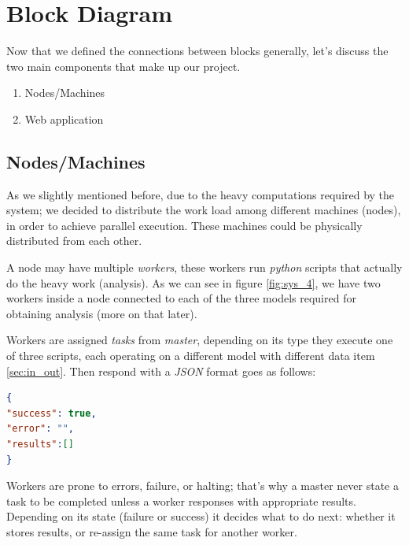 \newpage
\section{Block Diagram}
Now that we defined the connections between blocks generally, let's discuss the two main components that make up our project.
\begin{enumerate}
    \item Nodes/Machines
    \item Web application
\end{enumerate}


\subsection{Nodes/Machines}
As we slightly mentioned before, due to the heavy computations required by the system; we decided to distribute the work load among different machines (nodes), in order to achieve parallel execution. These machines could be physically distributed from each other. 

A node may have multiple \textit{workers}, these workers run \textit{python} scripts that actually do the heavy work (analysis). As we can see in figure \ref{fig:sys_4}, we have two workers inside a node connected to each of the three models required for obtaining analysis (more on that later).

Workers are assigned \textit{tasks} from \textit{master}, depending on its type they execute one of three scripts, each operating on a different model with different data item \ref{sec:in_out}. Then respond with a \textit{JSON} format goes as follows:

\begin{lstlisting}[language=json,firstnumber=1]
{
"success": true,
"error": "",
"results":[]
}
\end{lstlisting}


Workers are prone to errors, failure, or halting; that's why a master never state a task to be completed unless a worker responses with appropriate results. Depending on its state (failure or success) it decides what to do next: whether it stores results, or re-assign the same task for another worker.


